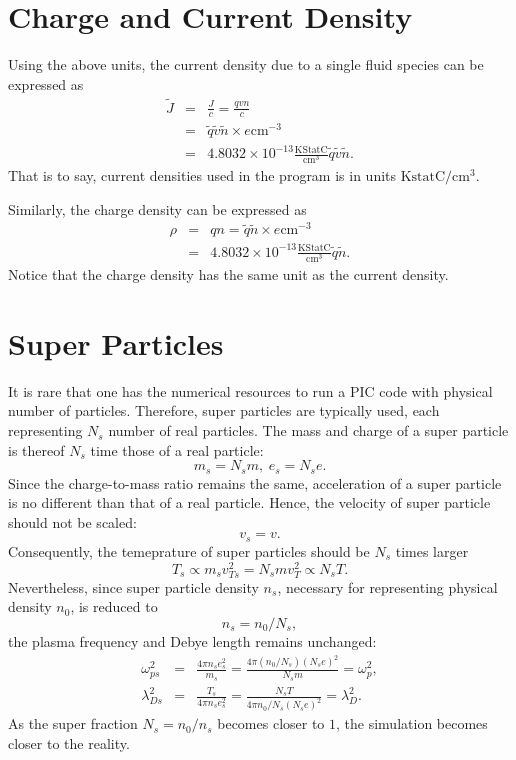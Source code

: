 \documentclass[paper=a4, fontsize=11pt]{scrartcl} %
\numberwithin{equation}{section} %
\numberwithin{figure}{section} %
\numberwithin{table}{section} %
\begin{document}
\section*{Charge and Current Density}
Using the above units, the current density due to a single fluid species can be expressed as
\begin{eqnarray}
    \tilde{J}&=&\frac{J}{c}=\frac{qvn}{c}\\
             &=&\tilde{q}\tilde{v}\tilde{n} \times e \text{cm}^{-3} \\
             &=&4.8032\times 10^{-13}\frac{\text{KStatC}}{\text{cm}^{3}}
                \tilde{q}\tilde{v}\tilde{n}.
\end{eqnarray}
That is to say, current densities used in the program is in units $\text{KstatC}/\text{cm}^3$.

Similarly, the charge density can be expressed as
\begin{eqnarray}
    \rho&=&qn=\tilde{q}\tilde{n} \times e \text{cm}^{-3} \\
             &=&4.8032\times 10^{-13}\frac{\text{KStatC}}{\text{cm}^{3}}\tilde{q}\tilde{n}.
\end{eqnarray}
Notice that the charge density has the same unit as the current density.

\section*{Super Particles}
It is rare that one has the numerical resources to run a PIC code with physical number of particles. Therefore, super particles are typically used, each representing $N_s$ number of real particles. The mass and charge of a super particle is thereof $N_s$ time those of a real particle:
\begin{equation}
    m_s=N_s m, \hspace{3pt} e_s=N_s e.
\end{equation}
Since the charge-to-mass ratio remains the same, acceleration of a super particle is no different than that of a real particle. Hence, the velocity of super particle should not be scaled:
\begin{equation}
    v_s=v.
\end{equation}
Consequently, the temeprature of super particles should be $N_s$ times larger
\begin{equation}
    T_s\propto m_s v_{Ts}^2=N_s m v_T^2\propto N_s T.
\end{equation}
Nevertheless, since super particle density $n_s$, necessary for representing physical density $n_0$, is reduced to
\begin{equation}
    n_s=n_0/N_s,
\end{equation}
the plasma frequency and Debye length remains unchanged:
\begin{eqnarray}
  \omega_{ps}^2&=&\frac{4\pi n_se_s^2}{m_s}=\frac{4\pi(n_0/N_s)(N_s e)^2}{N_s m}=\omega_p^2,\\
  \lambda_{Ds}^2&=&\frac{T_s}{4\pi n_s e_s^2}=\frac{N_s T}{4\pi n_0/N_s (N_s e)^2}=\lambda_D^2.
\end{eqnarray}
As the super fraction $N_s=n_0/n_s$ becomes closer to $1$, the simulation becomes closer to the reality.
\end{document}
